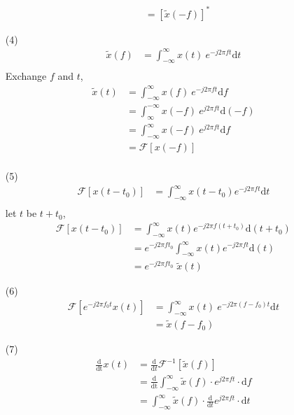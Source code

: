 \documentclass{article}
\begin{document}
\begin{enumerate}
\begin{align*}
        &= \left[ \widetilde{x}(-f) \right]^*
    \end{align*}
    \item[(4)]
    \begin{align*}
        \widetilde{x}(f) &= \int_{- \infty}^{\infty} x(t) ~ e^{-j2\pi f t} \mathrm{d}t\\
    \end{align*}
    Exchange $f$ and $t$,
    \begin{align*}
        \widetilde{x}(t) &= \int_{- \infty}^{\infty} x(f) ~ e^{-j2\pi f t} \mathrm{d}f\\
        &= \int_{\infty}^{-\infty} x(-f) ~ e^{j2\pi f t} \mathrm{d}(-f)\\
        &= \int_{-\infty}^{\infty} x(-f) ~ e^{j2\pi f t} \mathrm{d}f\\
        &= \mathcal{F}[x(-f)]\\
    \end{align*}
    \item[(5)]
    \begin{align*}
        \mathcal{F}[x(t - t_0)] &= \int_{- \infty}^{\infty} x(t - t_0) e^{-j2\pi f t} \mathrm{d}t\\
    \end{align*}
    let $t$ be $t + t_0$,
    \begin{align*}
        \mathcal{F}[x(t - t_0)]&= \int_{- \infty}^{\infty} x(t) e^{-j2\pi f (t + t_0)} \mathrm{d}(t + t_0)\\
        &= e^{-j2\pi f t_0} \int_{- \infty}^{\infty} x(t) e^{-j2\pi f t} \mathrm{d}(t)\\
        &= e^{-j2\pi f t_0} \; \widetilde{x}(t)
    \end{align*}
    \item[(6)]
    \begin{align*}
        \mathcal{F}\left[ e^{-j2\pi f_0 t} x(t) \right] &= \int_{- \infty}^{\infty} x(t) ~ e^{-j2\pi (f - f_0) t} \mathrm{d}t\\
        &= \widetilde{x}(f - f_0)
    \end{align*}
    \item[(7)]
    \begin{align*}
        \frac{\mathrm{d}}{\mathrm{dt}} x(t) &= \frac{\mathrm{d}}{\mathrm{d}t} \mathcal{F}^{-1} [ \widetilde{x}(f) ]\\
        &= \frac{\mathrm{d}}{\mathrm{dt}} \int_{- \infty}^{\infty} \widetilde{x}(f) \cdot e^{j2\pi f t} \cdot \mathrm{d}f\\
        &= \int_{- \infty}^{\infty} \widetilde{x}(f) \cdot \frac{\mathrm{d}}{\mathrm{d}t} e^{j2\pi f t} \cdot \mathrm{d}t\\

\end{align*}
\end{enumerate}
\end{document}
